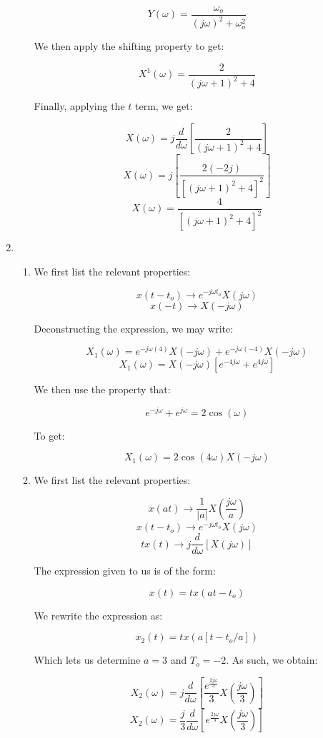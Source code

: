 \begin{enumerate}
\begin{enumerate}
        $$Y(\omega)=\frac{\omega_o}{(j\omega)^2+\omega_o^2}$$

        We then apply the shifting property to get:

        $$X^1(\omega)=\frac{2}{(j\omega+1)^2+4}$$

        Finally, applying the $t$ term, we get:

        $$X(\omega)=j\frac{d}{d\omega}\left[ \frac{2}{(j\omega+1)^2+4} \right]$$
        $$X(\omega)=j\left[ \frac{2(-2j)}{[(j\omega+1)^2+4]^2} \right]$$
        $$\boxed{X(\omega)=\frac{4}{[(j\omega+1)^2+4]^2}}$$

    \end{enumerate}

  \item

    \begin{enumerate}

      \item We first list the relevant properties:

        $$x(t-t_o)\to e^{-j\omega t_o}X(j\omega)$$
        $$x(-t)\to X(-j\omega)$$

        Deconstructing the expression, we may write:

        $$X_1(\omega)=e^{-j\omega(4)}X(-j\omega)+e^{-j\omega(-4)}X(-j\omega)$$
        $$X_1(\omega)=X(-j\omega)[e^{-4j\omega}+e^{4j\omega}]$$

        We then use the property that:

        $$e^{-j\omega}+e^{j\omega}=2\cos(\omega)$$

        To get:

        $$\boxed{X_1(\omega)=2\cos(4\omega)X(-j\omega)}$$

      \item We first list the relevant properties:

        $$x(at)\to \frac{1}{|a|}X\left( \frac{j\omega}{a} \right)$$
        $$x(t-t_o)\to e^{-j\omega t_o}X(j\omega)$$
        $$tx(t)\to j\frac{d}{d\omega}[X(j\omega)]$$

        The expression given to us is of the form:

        $$x(t)=tx(at-t_o)$$

        We rewrite the expression as:

        $$x_2(t)=tx(a[t-t_o/a])$$

        Which lets us determine $a=3$ and $T_o=-2$. As such, we obtain:

        $$X_2(\omega)=j\frac{d}{d\omega}\left[ \frac{e^{\frac{2j\omega}{3}}}{3}X\left(\frac{j\omega}{3}\right) \right]$$
        $$\boxed{X_2(\omega)=\frac{j}{3}\frac{d}{d\omega}\left[ e^{\frac{2j\omega}{3}}X\left(\frac{j\omega}{3}\right) \right]}$$


\end{enumerate}
\end{enumerate}
